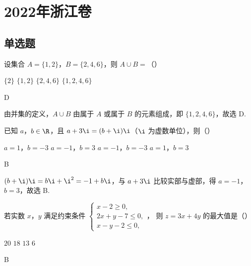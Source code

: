 \chapter{2022年浙江卷}

\section{单选题}

\begin{problem}
设集合 \(A=\{1,2\}\)，\(B=\{2,4,6\}\)，则 \(A\cup B=\)（\quad）

\choices
    {\(\{2\}\)}
    {\(\{1,2\}\)}
    {\(\{2,4,6\}\)}
    {\(\{1,2,4,6\}\)}
\end{problem}

\begin{answer}
D
\end{answer}

\begin{solution}
由并集的定义，\(A\cup B\) 由属于 \(A\) 或属于 \(B\) 的元素组成，即 \(\{1,2,4,6\}\)，故选 D.
\end{solution}

\begin{problem}
已知 \(a\)，\(b\in\R\)，且 \(a+3\i=(b+\i)\i\)（\(\i\) 为虚数单位），则（\quad）

\choices
    {\(a=1\)，\(b=-3\)}
    {\(a=-1\)，\(b=3\)}
    {\(a=-1\)，\(b=-3\)}
    {\(a=1\)，\(b=3\)}
\end{problem}

\begin{answer}
B
\end{answer}

\begin{solution}
\((b+\i)\i=b\i+\i^2=-1+b\i\)，与 \(a+3\i\) 比较实部与虚部，得 \(a=-1\)，\(b=3\)，故选 B.
\end{solution}

\begin{problem}
若实数 \(x\)，\(y\) 满足约束条件
\(\begin{cases}
x-2\ge 0,\\
2x+y-7\le 0,\\
x-y-2\le 0,
\end{cases}\)，
则 \(z=3x+4y\) 的最大值是（\quad）

\choices
    {\(20\)}
    {\(18\)}
    {\(13\)}
    {\(6\)}
\end{problem}

\begin{answer}
B
\end{answer}

